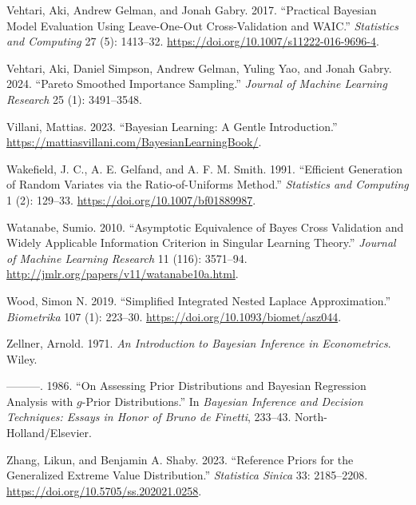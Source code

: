 \documentclass[
  11pt,
  letterpaper,
]{scrbook}
\newlength{\cslhangindent}
\newenvironment{CSLReferences}[2] %
 {\begin{list}{}{%
  \setlength{\itemindent}{0pt}
  \setlength{\leftmargin}{0pt}
  \setlength{\parsep}{0pt}
  \ifodd #1
   \setlength{\leftmargin}{\cslhangindent}
   \setlength{\itemindent}{-1\cslhangindent}
  \fi
  \setlength{\itemsep}{#2\baselineskip}}}
 {\end{list}}
\theoremstyle{definition}
\theoremstyle{plain}
\theoremstyle{plain}
\theoremstyle{plain}
\theoremstyle{definition}
\theoremstyle{definition}
\theoremstyle{remark}
\begin{document}
\begin{CSLReferences}{1}{0}
Vehtari, Aki, Andrew Gelman, and Jonah Gabry. 2017. {``Practical
{B}ayesian Model Evaluation Using Leave-One-Out Cross-Validation and
{WAIC}.''} \emph{Statistics and Computing} 27 (5): 1413--32.
\url{https://doi.org/10.1007/s11222-016-9696-4}.

Vehtari, Aki, Daniel Simpson, Andrew Gelman, Yuling Yao, and Jonah
Gabry. 2024. {``Pareto Smoothed Importance Sampling.''} \emph{Journal of
Machine Learning Research} 25 (1): 3491--3548.

Villani, Mattias. 2023. {``Bayesian Learning: A Gentle Introduction.''}
\url{https://mattiasvillani.com/BayesianLearningBook/}.

Wakefield, J. C., A. E. Gelfand, and A. F. M. Smith. 1991. {``Efficient
Generation of Random Variates via the Ratio-of-Uniforms Method.''}
\emph{Statistics and Computing} 1 (2): 129--33.
\url{https://doi.org/10.1007/bf01889987}.

Watanabe, Sumio. 2010. {``Asymptotic Equivalence of {B}ayes Cross
Validation and Widely Applicable Information Criterion in Singular
Learning Theory.''} \emph{Journal of Machine Learning Research} 11
(116): 3571--94. \url{http://jmlr.org/papers/v11/watanabe10a.html}.

Wood, Simon N. 2019. {``Simplified Integrated Nested {L}aplace
Approximation.''} \emph{Biometrika} 107 (1): 223--30.
\url{https://doi.org/10.1093/biomet/asz044}.

Zellner, Arnold. 1971. \emph{An Introduction to {B}ayesian Inference in
Econometrics}. Wiley.

---------. 1986. {``On Assessing Prior Distributions and {B}ayesian
Regression Analysis with \(g\)-Prior Distributions.''} In
\emph{{B}ayesian Inference and Decision Techniques: Essays in Honor of
{B}runo de {F}inetti}, 233--43. North-Holland/Elsevier.

Zhang, Likun, and Benjamin A. Shaby. 2023. {``Reference Priors for the
Generalized Extreme Value Distribution.''} \emph{Statistica Sinica} 33:
2185--2208. \url{https://doi.org/10.5705/ss.202021.0258}.

\end{CSLReferences}


\backmatter
\end{document}
